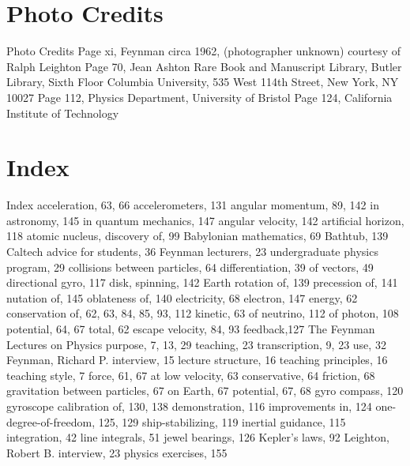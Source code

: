 \documentclass[10pt,oneside]{article}
\begin{document}
\clearpage
{}
\section*{Photo Credits}
\label{tips-sec-14-photo-credits}
Photo Credits Page xi, Feynman circa 1962, (photographer unknown) courtesy of Ralph Leighton Page 70, Jean Ashton Rare Book and Manuscript Library, Butler Library, Sixth Floor Columbia University, 535 West 114th Street, New York, NY 10027 Page 112, Physics Department, University of Bristol Page 124, California Institute of Technology\par

\clearpage
{}
\section*{Index}
\label{tips-sec-15-index}
Index acceleration, 63, 66 accelerometers, 131 angular momentum, 89, 142 in astronomy, 145 in quantum mechanics, 147 angular velocity, 142 artificial horizon, 118 atomic nucleus, discovery of, 99 Babylonian mathematics, 69 Bathtub, 139 Caltech advice for students, 36 Feynman lecturers, 23 undergraduate physics program, 29 collisions between particles, 64 differentiation, 39 of vectors, 49 directional gyro, 117 disk, spinning, 142 Earth rotation of, 139 precession of, 141 nutation of, 145 oblateness of, 140 electricity, 68 electron, 147 energy, 62 conservation of, 62, 63, 84, 85, 93, 112 kinetic, 63 of neutrino, 112 of photon, 108 potential, 64, 67 total, 62 escape velocity, 84, 93 feedback,127 The Feynman Lectures on Physics purpose, 7, 13, 29 teaching, 23 transcription, 9, 23 use, 32 Feynman, Richard P. interview, 15 lecture structure, 16 teaching principles, 16 teaching style, 7 force, 61, 67 at low velocity, 63 conservative, 64 friction, 68 gravitation between particles, 67 on Earth, 67 potential, 67, 68 gyro compass, 120 gyroscope calibration of, 130, 138 demonstration, 116 improvements in, 124 one-degree-of-freedom, 125, 129 ship-stabilizing, 119 inertial guidance, 115 integration, 42 line integrals, 51 jewel bearings, 126 Kepler’s laws, 92 Leighton, Robert B. interview, 23 physics exercises, 155\par
\end{document}
